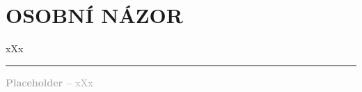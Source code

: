\documentclass{extarticle} %
\begin{document}




\section*{OSOBNÍ NÁZOR}
\noindent 
xXx

\vfill

\noindent\begin{minipage}{\textwidth}
    \textcolor{darkgray}{\rule{\linewidth}{0.4pt}
    \footnotesize
    \textbf{Placeholder --} xXx
    }
\end{minipage}
\end{document}
